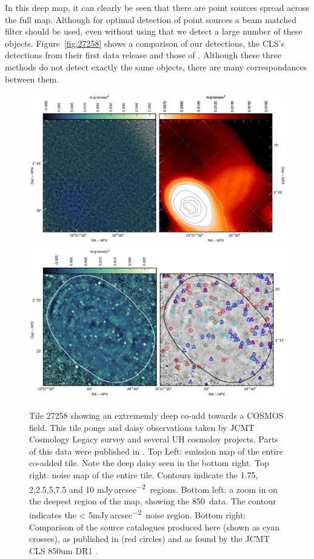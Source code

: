 \documentclass[twocolumn,times]{aastex6}
\newcommand{\jyas}{Jy\,arcsec\textsuperscript{$-$2}}
\begin{document}
In this deep map, it can clearly be seen that there are point sources
spread across the full map. Although for optimal detection of point
sources a beam matched filter should be used, even without using that
we detect a large number of these objects. Figure~\ref{fig:27258}
shows a comparison of our detections, the CLS's detections from their
first data release \citep{Geach2016} and those of
\citet{Casey2013}. Although these three methods do not detect exactly the
same objects, there are many correspondances between them.

\begin{figure}
  \includegraphics{27258-whole-map.pdf}
  \\[3mm]
  \includegraphics{27258-zoomin.pdf}
  \caption{Tile 27258 showing an extrememly deep co-add towards a
    COSMOS field. This tile pongs and daisy observations taken by JCMT
    Cosmology Legacy survey and several UH cosmoloy projects. Parts of
    this data were published in
    \citet{Casey2013,Chen2013,Chen2013a,Geach2016}. Top Left: emission
    map of the entire co-added tile. Note the deep daisy seen in the
    bottom right. Top right: noise map of the entire tile. Contours
    indicate the 1.75, 2,2.5,5,7.5 and 10 m\jyas\ regions. Bottom
    left: a zoom in on the deepest region of the map, showing the
    850\micron\ data. The contour indicates the < 5m\jyas\ noise
    region. Bottom right: Comparison of the source catalogues produced
    here (shown as cyan crosses), as published in \citealt{Casey2013}
    (red circles) and as found by the JCMT CLS 850um DR1 \citep[blue
    triangles]{Geach2016}. }
  \label{fig:t27258}
\end{figure}
\end{document}
